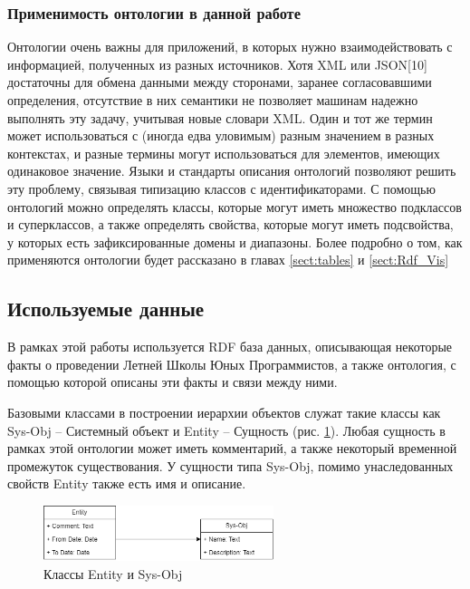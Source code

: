 \documentclass[12pt]{article}
\begin{document}
\subsubsection{Применимость онтологии в данной работе}
\qquad Онтологии очень важны для приложений, в которых нужно взаимодействовать с информацией, полученных из разных источников. Хотя XML или JSON[10] достаточны для обмена данными между сторонами, заранее согласовавшими определения, отсутствие в них семантики не позволяет машинам надежно выполнять эту задачу, учитывая новые словари XML. Один и тот же термин может использоваться с (иногда едва уловимым) разным значением в разных контекстах, и разные термины могут использоваться для элементов, имеющих одинаковое значение. Языки и стандарты описания онтологий позволяют решить эту проблему, связывая типизацию классов с идентификаторами. С помощью онтологий можно определять классы, которые могут иметь множество подклассов и суперклассов, а также определять свойства, которые могут иметь подсвойства, у которых есть зафиксированные домены и диапазоны. Более подробно о том, как применяются онтологии будет рассказано в главах \ref{sect:tables} и \ref{sect:Rdf_Vis}

\subsection{Используемые данные}
\qquad В рамках этой работы используется RDF база данных, описывающая некоторые факты о проведении Летней Школы Юных Программистов, а также онтология, с помощью которой описаны эти факты и связи между ними.

Базовыми классами в построении иерархии объектов служат такие классы как Sys-Obj -- Системный объект и Entity -- Сущность (рис. \ref{fig:ent_sys_obj}). Любая сущность в рамках этой онтологии может иметь комментарий, а также некоторый временной промежуток существования. У сущности типа Sys-Obj, помимо унаследованных свойств Entity также есть имя и описание.

\begin{figure}[!ht]
    \centering
    \includegraphics[width=0.6\textwidth]{_images/base_sch_onto.png}
    \caption{Классы Entity и Sys-Obj}
    \label{fig:ent_sys_obj}
\end{figure}
\end{document}
